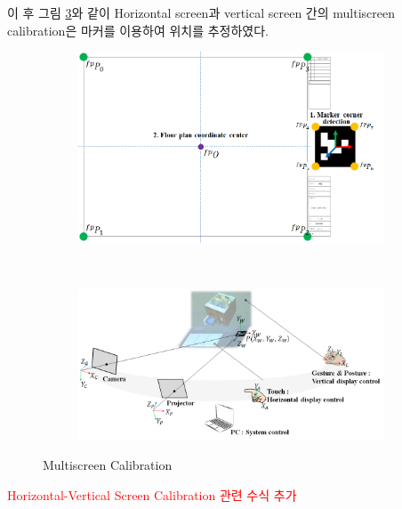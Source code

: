 이 후 그림 \ref{fig:multiscreen_calibration}와 같이 Horizontal screen과 vertical screen 간의 multiscreen calibration은 마커를 이용하여 위치를 추정하였다. 
\begin{figure}[!ht]
	\centering
        \begin{subfigure}[b]{0.8\textwidth}
            \centering
           \includegraphics[width=\textwidth]{3-System/marker_calibration1}
                \caption{}
                \label{fig:marker_1}
        \end{subfigure}
        \\
        \begin{subfigure}[b]{0.8\textwidth}
	        \centering
              \includegraphics[width=\columnwidth]{3-System/marker_calibration2}
              \caption{}
              \label{fig:hardware}
        \end{subfigure}%
	\caption{Multiscreen Calibration}
    \label{fig:multiscreen_calibration}
\end{figure}

\textcolor{red}{Horizontal-Vertical Screen Calibration 관련 수식 추가}

